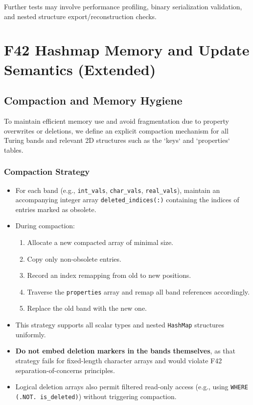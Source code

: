 \documentclass{article}
\begin{document}
\noindent
Further tests may involve performance profiling, binary serialization
validation, and nested structure export/reconstruction checks.

\section{F42 Hashmap Memory and Update Semantics (Extended)}

\subsection{Compaction and Memory Hygiene}

To maintain efficient memory use and avoid fragmentation due to property overwrites or deletions, we define an explicit compaction mechanism for all Turing bands and relevant 2D structures such as the `keys` and `properties` tables.

\subsubsection{Compaction Strategy}

\begin{itemize}
  \item For each band (e.g., \texttt{int\_vals}, \texttt{char\_vals}, \texttt{real\_vals}), maintain an accompanying integer array \texttt{deleted\_indices(:)} containing the indices of entries marked as obsolete.
  \item During compaction:
    \begin{enumerate}
      \item Allocate a new compacted array of minimal size.
      \item Copy only non-obsolete entries.
      \item Record an index remapping from old to new positions.
      \item Traverse the \texttt{properties} array and remap all band references accordingly.
      \item Replace the old band with the new one.
    \end{enumerate}
  \item This strategy supports all scalar types and nested \texttt{HashMap} structures uniformly.
  \item \textbf{Do not embed deletion markers in the bands themselves}, as that strategy fails for fixed-length character arrays and would violate F42 separation-of-concerns principles.
  \item Logical deletion arrays also permit filtered read-only access (e.g., using \texttt{WHERE (.NOT. is\_deleted)}) without triggering compaction.
\end{itemize}
\end{document}
